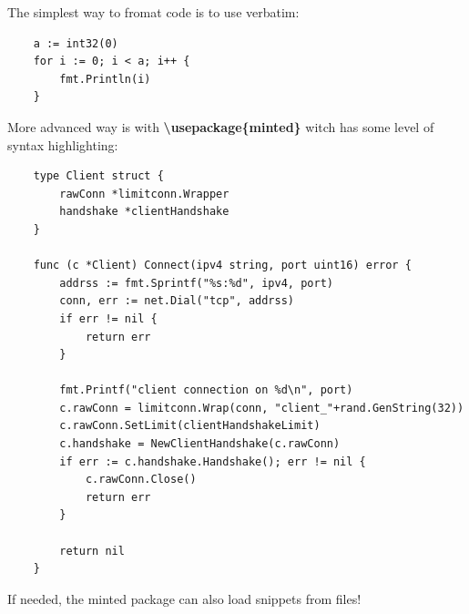 \documentclass[12pt]{article}
\begin{document}
The simplest way to fromat code is to use verbatim:
\begin{verbatim}
    a := int32(0)
    for i := 0; i < a; i++ {
        fmt.Println(i)
    }
\end{verbatim}

\noindent More advanced way is with \textbf{\textbackslash usepackage\{minted\}} witch has some level of syntax highlighting:
\begin{verbatim}
    type Client struct {
        rawConn *limitconn.Wrapper
        handshake *clientHandshake
    }

    func (c *Client) Connect(ipv4 string, port uint16) error {
        addrss := fmt.Sprintf("%s:%d", ipv4, port)
        conn, err := net.Dial("tcp", addrss)
        if err != nil {
            return err
        }

        fmt.Printf("client connection on %d\n", port)
        c.rawConn = limitconn.Wrap(conn, "client_"+rand.GenString(32))
        c.rawConn.SetLimit(clientHandshakeLimit)
        c.handshake = NewClientHandshake(c.rawConn)
        if err := c.handshake.Handshake(); err != nil {
            c.rawConn.Close()
            return err
        }

        return nil
    }
\end{verbatim}

\noindent If needed, the minted package can also load snippets from files!

\newpage
\printbibliography
\end{document}
